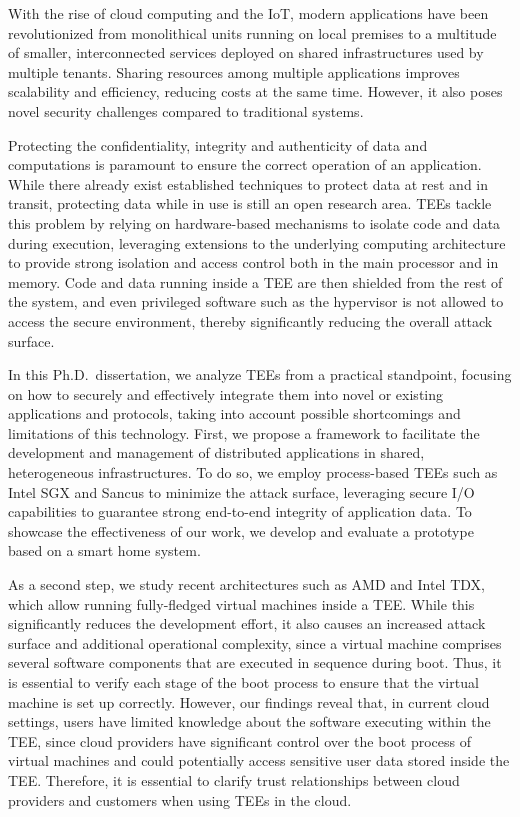 With the rise of cloud computing and the \ac{IoT}, modern applications have been
revolutionized from monolithical units running on local premises to a multitude
of smaller, interconnected services deployed on shared infrastructures used by
multiple tenants. Sharing resources among multiple applications improves
scalability and efficiency, reducing costs at the same time. However, it also
poses novel security challenges compared to traditional systems.

Protecting the confidentiality, integrity and authenticity of data and
computations is paramount to ensure the correct operation of an application.
While there already exist established techniques to protect data at rest and in
transit, protecting data while in use is still an open research area. \acp{TEE}
tackle this problem by relying on hardware-based mechanisms to isolate code and
data during execution, leveraging extensions to the underlying computing
architecture to provide strong isolation and access control both in the main
processor and in memory. Code and data running inside a \ac{TEE} are then
shielded from the rest of the system, and even privileged software such as the
hypervisor is not allowed to access the secure environment, thereby
significantly reducing the overall attack surface.

In this Ph.D.\ dissertation, we analyze \acp{TEE} from a practical standpoint,
focusing on how to securely and effectively integrate them into novel or
existing applications and protocols, taking into account possible shortcomings
and limitations of this technology. First, we propose a framework to facilitate
the development and management of distributed applications in shared,
heterogeneous infrastructures. To do so, we employ process-based \acp{TEE} such
as Intel \ac{SGX} and Sancus to minimize the attack surface, leveraging secure
I/O capabilities to guarantee strong end-to-end integrity of application data.
To showcase the effectiveness of our work, we develop and evaluate a prototype
based on a smart home system.

As a second step, we study recent architectures such as AMD \sevsnp{} and Intel
\ac{TDX}, which allow running fully-fledged virtual machines inside a \ac{TEE}.
While this significantly reduces the development effort, it also causes an
increased attack surface and additional operational complexity, since a virtual
machine comprises several software components that are executed in sequence
during boot. Thus, it is essential to verify each stage of the boot process to
ensure that the virtual machine is set up correctly. However, our findings
reveal that, in current cloud settings, users have limited knowledge about the
software executing within the \ac{TEE}, since cloud providers have significant
control over the boot process of virtual machines and could potentially access
sensitive user data stored inside the \ac{TEE}. Therefore, it is essential to
clarify trust relationships between cloud providers and customers when using
\acp{TEE} in the cloud.


